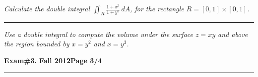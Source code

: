\documentclass[12pt]{article}
\begin{document}
\bigskip
{\problem[15 pts] \em Calculate the double integral
$\displaystyle{\iint_R \frac{1+x^2}{1+y^2}}\, dA$, for the rectangle
$R=[0,1]\times[0,1]$.}
\vspace{8cm}
\begin{flushright}
\end{flushright}
\hrule
{\problem[15 pts] \em Use a double integral to compute the volume under
the surface $z=xy$ and above the region bounded by $x=y^2$ and $x=y^3$.}
\vspace{8cm}
\begin{flushright}
\end{flushright}
\newpage

\hfill{\large\bf Exam\#3.}\hfill{\large\bf
  Fall 2012}\hfill{\large\bf Page 3/4}\hrule
\end{document}
